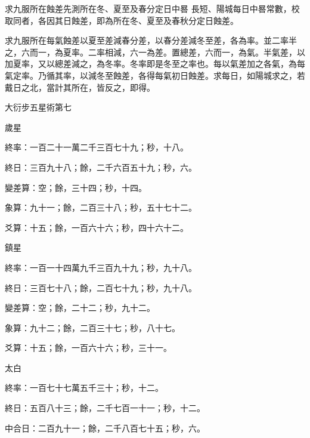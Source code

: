 \begin{pinyinscope}
 求九服所在蝕差先測所在冬、夏至及春分定日中晷
 長短、陽城每日中晷常數，校取同者，各因其日蝕差，即為所在冬、夏至及春秋分定日蝕差。



 求九服所在每氣蝕差以夏至差減春分差，以春分差減冬至差，各為率。並二率半之，六而一，為夏率。二率相減，六一為差。置總差，六而一，為氣。半氣差，以加夏率，又以總差減之，為冬率。冬率即是冬至之率也。每以氣差加之各氣，為每氣定率。乃循其率，以減冬至蝕差，各得每氣初日蝕差。求每日，如陽城求之，若戴日之北，當計其所在，皆反之，即得。



 大衍步五星術第七



 歲星



 終率：一百二十一萬二千三百七十九；秒，十八。



 終日：三百九十八；餘，二千六百五十九；秒，六。



 變差算：空；餘，三十四；秒，十四。



 象算：九十一；餘，二百三十八；秒，五十七十二。



 爻算：十五；餘，一百六十六；秒，四十六十二。



 鎮星



 終率：一百一十四萬九千三百九十九；秒，九十八。



 終日：三百七十八；餘，二百七十九；秒，九十八。



 變差算：空；餘，二十二；秒，九十二。



 象算：九十二；餘，二百三十七；秒，八十七。



 爻算：十五；餘，一百六十六；秒，三十一。



 太白



 終率：一百七十七萬五千三十；秒，十二。



 終日：五百八十三；餘，二千七百一十一；秒，十二。



 中合日：二百九十一；餘，二千八百七十五；秒，六。




\end{pinyinscope}
